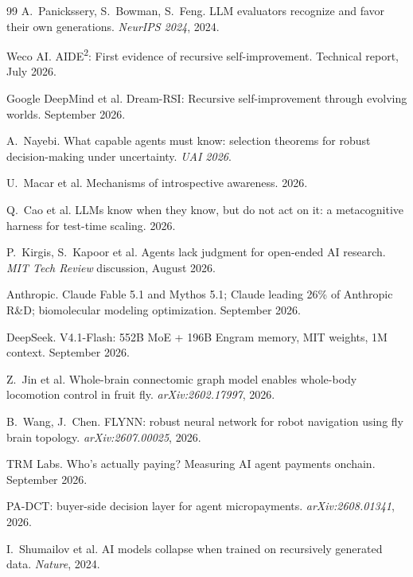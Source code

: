 \documentclass[11pt]{article}
\begin{document}
\begin{thebibliography}{99}
 A.\ Panickssery, S.\ Bowman, S.\ Feng. LLM evaluators recognize and favor their own generations. \textit{NeurIPS 2024}, 2024.

 Weco AI. AIDE\textsuperscript{2}: First evidence of recursive self-improvement. Technical report, July 2026.

 Google DeepMind et al. Dream-RSI: Recursive self-improvement through evolving worlds. September 2026.

 A.\ Nayebi. What capable agents must know: selection theorems for robust decision-making under uncertainty. \textit{UAI 2026}.

 U.\ Macar et al. Mechanisms of introspective awareness. 2026.

 Q.\ Cao et al. LLMs know when they know, but do not act on it: a metacognitive harness for test-time scaling. 2026.

 P.\ Kirgis, S.\ Kapoor et al. Agents lack judgment for open-ended AI research. \textit{MIT Tech Review} discussion, August 2026.

 Anthropic. Claude Fable 5.1 and Mythos 5.1; Claude leading 26\% of Anthropic R\&D; biomolecular modeling optimization. September 2026.

 DeepSeek. V4.1-Flash: 552B MoE + 196B Engram memory, MIT weights, 1M context. September 2026.

 Z.\ Jin et al. Whole-brain connectomic graph model enables whole-body locomotion control in fruit fly. \textit{arXiv:2602.17997}, 2026.

 B.\ Wang, J.\ Chen. FLYNN: robust neural network for robot navigation using fly brain topology. \textit{arXiv:2607.00025}, 2026.

 TRM Labs. Who's actually paying? Measuring AI agent payments onchain. September 2026.

 PA-DCT: buyer-side decision layer for agent micropayments. \textit{arXiv:2608.01341}, 2026.

 I.\ Shumailov et al. AI models collapse when trained on recursively generated data. \textit{Nature}, 2024.


\end{thebibliography}
\end{document}
